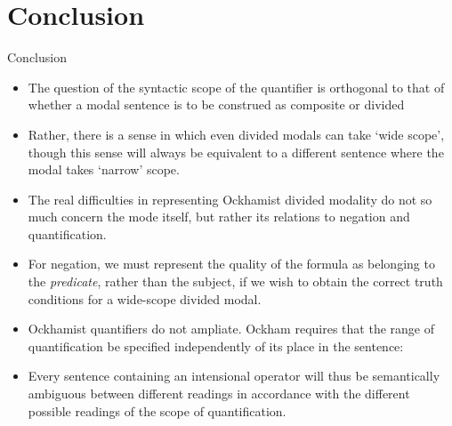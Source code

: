 \documentclass{beamer}
\begin{document}
	\section{Conclusion}
	\begin{frame}{Conclusion}
\begin{itemize}
	\item The question of the syntactic scope of the quantifier is orthogonal to that of whether a modal sentence is to be construed as composite or divided \pause 
	\item Rather, there is a sense in which even divided modals can take `wide scope', though this sense will always be equivalent to a different sentence where the modal takes `narrow' scope. \pause 
	\item The real difficulties in representing Ockhamist divided modality do not so much concern the mode itself, but rather its relations to negation and quantification.
\end{itemize}		
	\end{frame}
	\begin{frame}
	\begin{itemize}
		\item For negation, we must represent the quality of the formula as belonging to the \textit{predicate}, rather than the subject, if we wish to obtain the correct truth conditions for a wide-scope divided modal. \pause  
		\item Ockhamist quantifiers do not ampliate. Ockham requires that the range of quantification be specified independently of its place in the sentence: 
		\item Every sentence containing an intensional operator will thus be semantically ambiguous between different readings in accordance with the different possible readings of the scope of quantification.
	\end{itemize}
	\end{frame}
\end{document}
